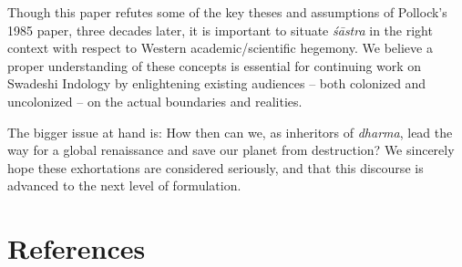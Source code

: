Though this paper refutes some of the key theses and assumptions of Pollock’s 1985 paper, three decades later, it is important to situate \textit{śāstra} in the right context with respect to Western academic/scientific hegemony. We believe a proper understanding of these concepts is essential for continuing work on Swadeshi Indology by enlightening existing audiences – both colonized and uncolonized – on the actual boundaries and realities.

The bigger issue at hand is: How then can we, as inheritors of \textit{dharma}, lead the way for a global renaissance and save our planet from destruction? We sincerely hope these exhortations are considered seriously, and that this discourse is advanced to the next level of formulation.


\section*{References}

